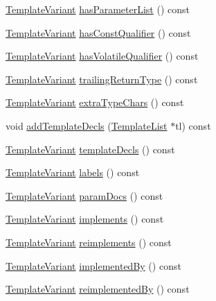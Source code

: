 \begin{DoxyCompactItemize}
\item 
\hyperlink{class_template_variant}{Template\+Variant} \hyperlink{class_member_context_1_1_private_a87fe13b493aa142eb2773ec9ad433aa3}{has\+Parameter\+List} () const 
\item 
\hyperlink{class_template_variant}{Template\+Variant} \hyperlink{class_member_context_1_1_private_aa4cb17cc5f1f3f4c1b5828809a552c3a}{has\+Const\+Qualifier} () const 
\item 
\hyperlink{class_template_variant}{Template\+Variant} \hyperlink{class_member_context_1_1_private_ade036e300083774b9bc751a1ba27082f}{has\+Volatile\+Qualifier} () const 
\item 
\hyperlink{class_template_variant}{Template\+Variant} \hyperlink{class_member_context_1_1_private_a83a52de8acbaa6bdc92cdcd561b89dc8}{trailing\+Return\+Type} () const 
\item 
\hyperlink{class_template_variant}{Template\+Variant} \hyperlink{class_member_context_1_1_private_ad250c474a309a28bdda449aa57a8edd6}{extra\+Type\+Chars} () const 
\item 
void \hyperlink{class_member_context_1_1_private_a1afc70de7460f53c298df5caddc0840c}{add\+Template\+Decls} (\hyperlink{class_template_list}{Template\+List} $\ast$tl) const 
\item 
\hyperlink{class_template_variant}{Template\+Variant} \hyperlink{class_member_context_1_1_private_ad640949236333120760ae699b75fc7c6}{template\+Decls} () const 
\item 
\hyperlink{class_template_variant}{Template\+Variant} \hyperlink{class_member_context_1_1_private_a33b74119a08368b9791b721211647868}{labels} () const 
\item 
\hyperlink{class_template_variant}{Template\+Variant} \hyperlink{class_member_context_1_1_private_a8d0003de7852529fcfcdedfa78155b66}{param\+Docs} () const 
\item 
\hyperlink{class_template_variant}{Template\+Variant} \hyperlink{class_member_context_1_1_private_afc26a0326f5b45458f7a2bdc64bf2b4d}{implements} () const 
\item 
\hyperlink{class_template_variant}{Template\+Variant} \hyperlink{class_member_context_1_1_private_aae254458bfa2fd3c0c8e70257dda6ab0}{reimplements} () const 
\item 
\hyperlink{class_template_variant}{Template\+Variant} \hyperlink{class_member_context_1_1_private_adfa6a8928d56ca718f30a78d317d1896}{implemented\+By} () const 
\item 
\hyperlink{class_template_variant}{Template\+Variant} \hyperlink{class_member_context_1_1_private_ac7a9c07725e89788c17ad1d699ce7735}{reimplemented\+By} () const 

\end{DoxyCompactItemize}
